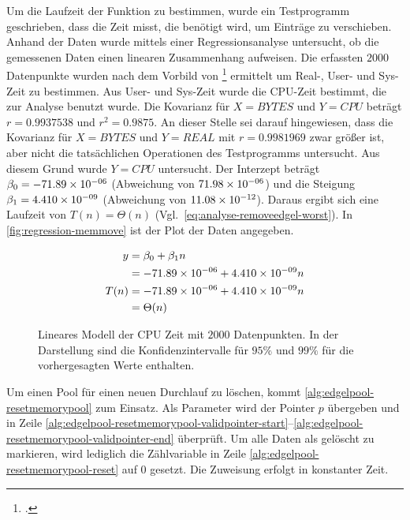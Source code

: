 Um die Laufzeit der Funktion  zu bestimmen, wurde ein Testprogramm geschrieben, dass die Zeit misst,
 die benötigt wird, um Einträge zu verschieben. Anhand der Daten wurde mittels einer Regressionsanalyse untersucht, ob
 die gemessenen Daten einen linearen Zusammenhang aufweisen. Die erfassten $2000$ Datenpunkte wurden nach dem Vorbild
 von \footcite{time-1} ermittelt um Real-, User- und Sys-Zeit zu bestimmen. Aus User- und Sys-Zeit wurde
 die CPU-Zeit bestimmt, die zur Analyse benutzt wurde. Die Kovarianz für $X = \mathit{BYTES}$ und $Y = \mathit{CPU}$
 beträgt $r = 0.9937538$ und $r^2 = 0.9875$. An dieser Stelle sei darauf hingewiesen, dass die Kovarianz für
 $X = \mathit{BYTES}$ und $Y = \mathit{REAL}$ mit $r = 0.9981969$ zwar größer ist, aber nicht die tatsächlichen
 Operationen des Testprogramms untersucht. Aus diesem Grund wurde $Y = \mathit{CPU}$ untersucht. Der Interzept beträgt
 $\beta_0 = -71.89\times 10^{-06}$ (Abweichung von $71.98\times 10^{-06}$) und die Steigung $\beta_1 = 4.410\times 10^{-09}$ (Abweichung von
 $11.08\times 10^{-12}$). Daraus ergibt sich eine Laufzeit von $T(n) =\Theta(n)$ (Vgl.~\autoref{eq:analyse-removeedgel-worst}).
 In \autoref{fig:regression-memmove} ist der Plot der Daten angegeben.

\begin{equation}
	\label{eq:analyse-removeedgel-worst}
	\begin{split}
		y& = \beta_0 + \beta_1n\\
		 & = -71.89\times 10^{-06} + 4.410\times 10^{-09}n\\
		T(n)& = -71.89\times 10^{-06} + 4.410\times 10^{-09}n\\
		 & = \Theta(n)
	\end{split}
\end{equation}

\begin{figure}[!ht]
	\centering
	
	\caption{Lineares Modell der CPU Zeit mit $2000$ Datenpunkten. In der Darstellung sind die Konfidenzintervalle für
	 $95\%$ und $99\%$ für die vorhergesagten Werte enthalten.}
	\label{fig:regression-memmove}
\end{figure}

Um einen Pool für einen neuen Durchlauf zu löschen, kommt \autoref{alg:edgelpool-resetmemorypool} zum Einsatz. Als
 Parameter wird der Pointer $p$ übergeben und in Zeile
 \ref{alg:edgelpool-resetmemorypool-validpointer-start}--\ref{alg:edgelpool-resetmemorypool-validpointer-end}
 überprüft. Um alle Daten als gelöscht zu markieren, wird lediglich die Zählvariable in Zeile
 \ref{alg:edgelpool-resetmemorypool-reset} auf $0$ gesetzt. Die Zuweisung erfolgt in konstanter Zeit.

